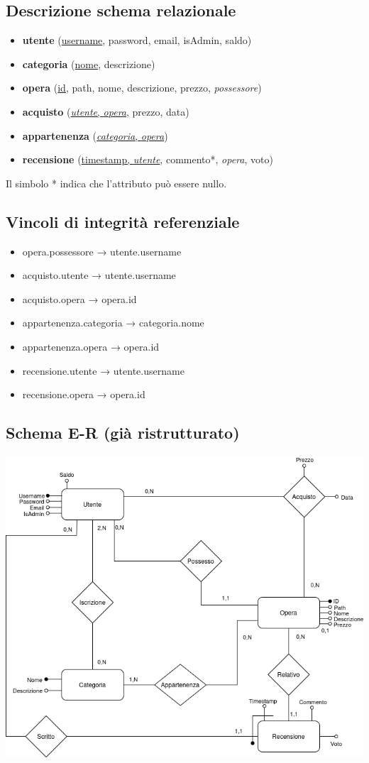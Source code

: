 \documentclass[10pt]{article}
\begin{document}
\subsection{Descrizione schema relazionale}
\begin{itemize}
    \item \textbf{utente} (\underline{username}, password, email, isAdmin, saldo)
    \item \textbf{categoria} (\underline{nome}, descrizione)
    \item \textbf{opera} (\underline{id}, path, nome, descrizione, prezzo, \textit{possessore})
    \item \textbf{acquisto} (\underline{\textit{utente}, \textit{opera}}, prezzo, data)
    \item \textbf{appartenenza} (\underline{\textit{categoria}, \textit{opera}})
    \item \textbf{recensione} (\underline{timestamp, \textit{utente}}, commento*, \textit{opera}, voto)
\end{itemize}
Il simbolo * indica che l'attributo può essere nullo.

\subsection{Vincoli di integrità referenziale }
\begin{itemize}
    \item opera.possessore → utente.username
    \item acquisto.utente → utente.username
    \item acquisto.opera → opera.id
    \item appartenenza.categoria → categoria.nome
    \item appartenenza.opera → opera.id
    \item recensione.utente → utente.username
    \item recensione.opera → opera.id
\end{itemize}
\subsection{Schema E-R (già ristrutturato)}
\begin{center}
    \includegraphics[width=0.6\linewidth]{schema_ristrutturato.png}
\end{center}
\end{document}

